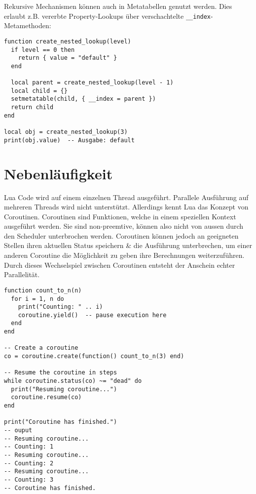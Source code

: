 \documentclass[11pt,a4paper]{article}
\begin{document}
Rekursive Mechanismen können auch in Metatabellen genutzt werden. Dies erlaubt z.B. vererbte Property-Lookups über verschachtelte \texttt{\_\_index}-Metamethoden:

\begin{lstlisting}
function create_nested_lookup(level)
  if level == 0 then
    return { value = "default" }
  end

  local parent = create_nested_lookup(level - 1)
  local child = {}
  setmetatable(child, { __index = parent })
  return child
end

local obj = create_nested_lookup(3)
print(obj.value)  -- Ausgabe: default
\end{lstlisting}

\section*{Nebenläufigkeit}

Lua Code wird auf einem einzelnen Thread ausgeführt. Parallele Ausführung auf mehreren Threads wird nicht unterstützt. Allerdings kennt Lua das Konzept von Coroutinen. Coroutinen sind Funktionen, welche in einem speziellen Kontext ausgeführt werden. Sie sind non-preemtive, können also nicht von aussen durch den Scheduler unterbrochen werden. Coroutinen können jedoch an geeigneten Stellen ihren aktuellen Status speichern \& die Ausführung unterbrechen, um einer anderen Coroutine die Möglichkeit zu geben ihre Berechnungen weiterzuführen. Durch dieses Wechselspiel zwischen Coroutinen entsteht der Anschein echter Parallelität.

\begin{lstlisting}
function count_to_n(n)
  for i = 1, n do
    print("Counting: " .. i)
    coroutine.yield()  -- pause execution here
  end
end

-- Create a coroutine
co = coroutine.create(function() count_to_n(3) end)

-- Resume the coroutine in steps
while coroutine.status(co) ~= "dead" do
  print("Resuming coroutine...")
  coroutine.resume(co)
end

print("Coroutine has finished.")
-- ouput
-- Resuming coroutine...
-- Counting: 1
-- Resuming coroutine...
-- Counting: 2
-- Resuming coroutine...
-- Counting: 3
-- Coroutine has finished.
\end{lstlisting}
\end{document}
